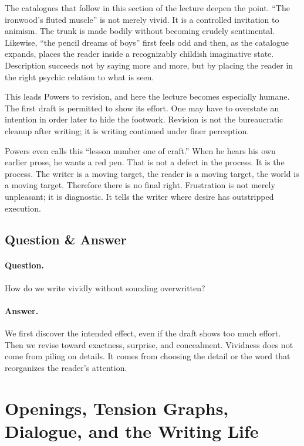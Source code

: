The catalogues that follow in this section of the lecture deepen the point. ``The ironwood's fluted muscle'' is not merely vivid. It is a controlled invitation to animism. The trunk is made bodily without becoming crudely sentimental. Likewise, ``the pencil dreams of boys'' first feels odd and then, as the catalogue expands, places the reader inside a recognizably childish imaginative state. Description succeeds not by saying more and more, but by placing the reader in the right psychic relation to what is seen.

This leads Powers to revision, and here the lecture becomes especially humane. The first draft is permitted to show its effort. One may have to overstate an intention in order later to hide the footwork. Revision is not the bureaucratic cleanup after writing; it is writing continued under finer perception.

Powers even calls this ``lesson number one of craft.'' When he hears his own earlier prose, he wants a red pen. That is not a defect in the process. It is the process. The writer is a moving target, the reader is a moving target, the world is a moving target. Therefore there is no final right. Frustration is not merely unpleasant; it is diagnostic. It tells the writer where desire has outstripped execution.

\subsection{Question \& Answer}

\paragraph{Question.} How do we write vividly without sounding overwritten?

\paragraph{Answer.} We first discover the intended effect, even if the draft shows too much effort. Then we revise toward exactness, surprise, and concealment. Vividness does not come from piling on details. It comes from choosing the detail or the word that reorganizes the reader's attention.

\section{Openings, Tension Graphs, Dialogue, and the Writing Life}

